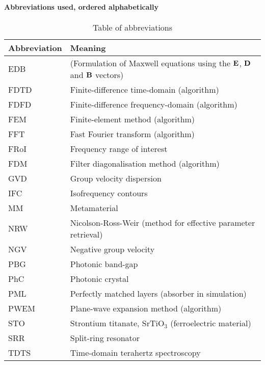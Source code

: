 \paragraph{Abbreviations used, ordered alphabetically} %
\begin{table}[ht]   \caption{Table of abbreviations}  \label{tb_shortcuts} \centering 
\begin{tabular}{ll}
 \toprule
Abbreviation & Meaning	\\
 \hline
EDB		& (Formulation of Maxwell equations using the $\mathbf{E}$, $\mathbf{D}$ and $\mathbf{B}$ vectors)\\
FDTD 		& Finite-difference time-domain (algorithm)\\
FDFD 		& Finite-difference frequency-domain (algorithm)\\
FEM 		& Finite-element method (algorithm)\\
FFT 		& Fast Fourier transform (algorithm)\\
FRoI 		& Frequency range of interest\\
FDM 		& Filter diagonalisation method (algorithm)\\
GVD 		& Group velocity dispersion \\
IFC		& Isofrequency contours\\
MM		& Metamaterial\\
NRW 		& Nicolson-Ross-Weir (method for effective parameter retrieval)\\
NGV 		& Negative group velocity\\
PBG		& Photonic band-gap\\
PhC 		& Photonic crystal\\
PML 		& Perfectly matched layers (absorber in simulation)\\
PWEM 		& Plane-wave expansion method (algorithm)\\
STO		& Strontium titanate, SrTiO$_3$ (ferroelectric material)\\
SRR		& Split-ring resonator\\
TDTS 		& Time-domain terahertz spectroscopy\\
 \bottomrule
 \end{tabular} \end{table}

